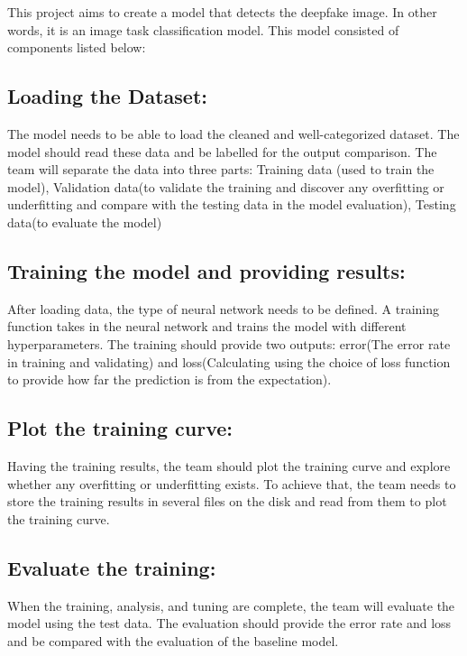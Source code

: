 \documentclass{article} %
\begin{document}
This project aims to create a model that detects the deepfake image. In other words, it is an image task classification model. This model consisted of components listed below:

\subsection{Loading the Dataset:}

The model needs to be able to load the cleaned and well-categorized dataset. The model should read these data and be labelled for the output comparison. The team will separate the data into three parts: Training data (used to train the model),  Validation data(to validate the training and discover any overfitting or underfitting and compare with the testing data in the model evaluation), Testing data(to evaluate the model)

\subsection{Training the model and providing results:}

After loading data, the type of neural network needs to be defined. A training function takes in the neural network and trains the model with different hyperparameters. The training should provide two outputs: error(The error rate in training and validating) and loss(Calculating using the choice of loss function to provide how far the prediction is from the expectation). 

\subsection{Plot the training curve:}

Having the training results, the team should plot the training curve and explore whether any overfitting or underfitting exists. To achieve that, the team needs to store the training results in several files on the disk and read from them to plot the training curve.

\subsection{Evaluate the training:}

When the training, analysis, and tuning are complete, the team will evaluate the model using the test data. The evaluation should provide the error rate and loss and be compared with the evaluation of the baseline model.
\end{document}
